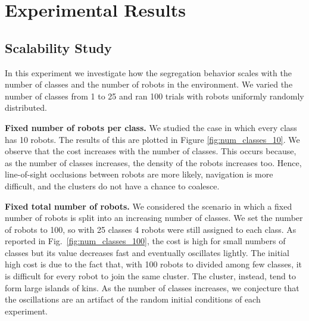 \documentclass[conference]{IEEEtran}
\newcommand{\myparagraph}[1]{\textbf{#1.}}
\begin{document}

\section{Experimental Results}



\subsection{Scalability Study} \label{section:scalability}

In this experiment we investigate how the segregation behavior scales with the
number of classes and the number of robots in the environment. We varied the
number of classes from 1 to 25 and ran 100 trials with robots uniformly randomly
distributed.

\myparagraph{Fixed number of robots per class}
We studied the case in which every class has 10 robots. The results of this are
plotted in Figure \ref{fig:num_classes_10}. We observe that the cost increases
with the number of classes. This occurs because, as the number of classes
increases, the density of the robots increases too. Hence, line-of-sight
occlusions between robots are more likely, navigation is more difficult, and the
clusters do not have a chance to coalesce.

\myparagraph{Fixed total number of robots}
We considered the scenario in which a fixed number of robots is split into an
increasing number of classes. We set the number of robots to 100, so with 25
classes 4 robots were still assigned to each class. As reported in
Fig.~\ref{fig:num_classes_100}, the cost is high for small numbers of classes
but its value decreases fast and eventually oscillates lightly. The initial high
cost is due to the fact that, with 100 robots to divided among few classes, it
is difficult for every robot to join the same cluster. The cluster, instead,
tend to form large islands of kins. As the number of classes increases, we
conjecture that the oscillations are an artifact of the random initial
conditions of each experiment.
\end{document}
